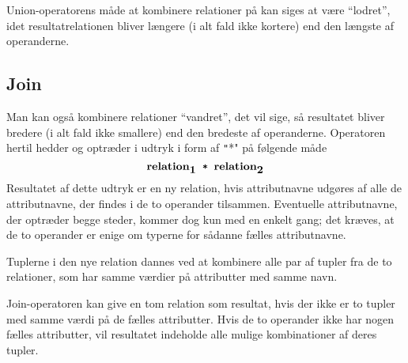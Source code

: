 \documentclass{article}
\begin{document}
\newpage
Union-operatorens m\aa{}de at kombinere relationer
p\aa{} kan siges at v\ae{}re ``lodret'', idet resultatrelationen bliver
l\ae{}ngere (i alt fald ikke kortere) end den l\ae{}ngste af operanderne.

\subsection{Join}
Man kan ogs\aa{} kombinere relationer ``vandret'', det vil sige, s\aa{}
resultatet bliver bredere (i alt fald ikke smallere) end den
bredeste af operanderne. Operatoren hertil hedder {\em {}\/} og
optr\ae{}der i udtryk i form af \texttt"*" p\aa{} f\o{}lgende m\aa{}de
$$ \mbox{\bf relation}_{\mbox{\bf 1}}\mbox{\tt ~*~}\mbox{\bf relation}_{\mbox{\bf 2}}$$
Resultatet af dette udtryk er en ny relation, hvis attributnavne udg\o{}res
af alle de attributnavne, der findes i de to operander tilsammen.
Eventuelle attributnavne, der optr\ae{}der begge steder, kommer dog kun med
en enkelt gang; det kr\ae{}ves, at de to operander er enige om
typerne for s\aa{}danne f\ae{}lles attributnavne.

Tuplerne i den nye relation dannes ved at kombinere alle par af tupler fra
de to relationer, som har samme v\ae{}rdier p\aa{} attributter med samme navn.

Join-operatoren kan give en tom relation som resultat, hvis
der ikke er to tupler med samme v\ae{}rdi p\aa{} de f\ae{}lles attributter.
Hvis de to operander ikke har nogen f\ae{}lles
attributter, vil resultatet indeholde alle mulige kombinationer
af deres tupler.
\end{document}
